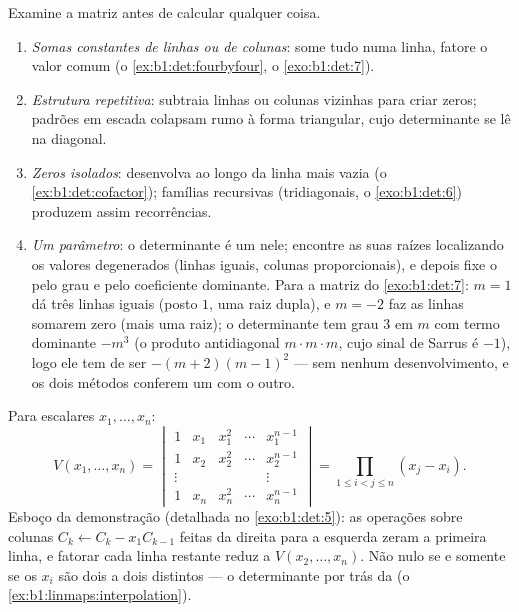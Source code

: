 \begin{method}
\label{met:b1:det:strategy}
Examine a matriz antes de calcular qualquer coisa.
\begin{enumerate}
  \item \emph{Somas constantes de linhas ou de colunas}: some tudo
        numa linha, fatore o valor comum
        (o \cref{ex:b1:det:fourbyfour}, o \cref{exo:b1:det:7}).
  \item \emph{Estrutura repetitiva}: subtraia linhas ou colunas
        vizinhas para criar zeros; padrões em escada colapsam rumo à
        forma triangular, cujo determinante se lê na diagonal.
  \item \emph{Zeros isolados}: desenvolva ao longo da linha mais
        vazia (o \cref{ex:b1:det:cofactor}); famílias recursivas (tridiagonais,
        o \cref{exo:b1:det:6}) produzem assim recorrências.
  \item \emph{Um parâmetro}: o determinante é um  nele;
        encontre as suas raízes localizando os valores degenerados
        (linhas iguais, colunas proporcionais), e depois fixe o
         pelo grau e pelo coeficiente dominante. Para a
        matriz do \cref{exo:b1:det:7}: $m = 1$ dá três linhas iguais (posto $1$,
        uma raiz dupla), e $m = -2$ faz as linhas somarem zero (mais
        uma raiz); o determinante tem grau $3$ em $m$ com termo
        dominante $-m^3$ (o produto antidiagonal $m\cdot m\cdot m$, cujo sinal
        de Sarrus é $-1$), logo ele tem de ser $-(m+2)(m-1)^2$ --- sem nenhum
        desenvolvimento, e os dois métodos conferem um com o outro.
\end{enumerate}
\end{method}

\begin{example}\label{ex:b1:det:vandermonde}
Para escalares $x_1, \dots, x_n$:
\[
V(x_1, \dots, x_n) =
\begin{vmatrix}
1 & x_1 & x_1^2 & \cdots & x_1^{n-1}\\
1 & x_2 & x_2^2 & \cdots & x_2^{n-1}\\
\vdots & & & & \vdots\\
1 & x_n & x_n^2 & \cdots & x_n^{n-1}
\end{vmatrix}
= \prod_{1 \leq i < j \leq n} (x_j - x_i) .
\]
Esboço da demonstração (detalhada no \cref{exo:b1:det:5}): as operações sobre
colunas $C_k \leftarrow C_k - x_1 C_{k-1}$ feitas da direita para a esquerda zeram a primeira
linha, e fatorar cada linha restante reduz a $V(x_2, \dots, x_n)$. Não nulo se e
somente se os $x_i$ são dois a dois distintos --- o determinante por
trás da  (o \cref{ex:b1:linmaps:interpolation}).
\end{example}

